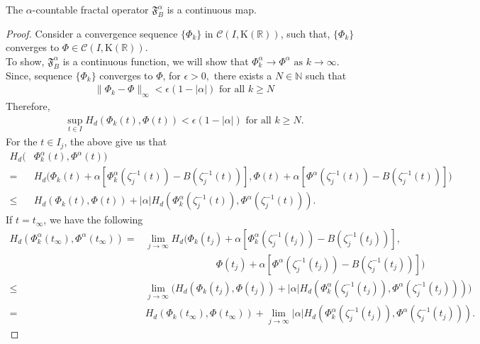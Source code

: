 \documentclass[10pt,a4paper]{amsart}
\begin{document}
\begin{theorem}\label{fractoperator}
The $\alpha$-countable fractal operator $\mathfrak{F}^{\alpha}_B$ is a continuous map.
\end{theorem}

\begin{proof}
Consider a convergence sequence $\{\Phi_k\}$ in $\mathcal{C}(I,\mathrm{K}(\mathbb{R}))$, such that, $\{\Phi_k\}$ converges to $\Phi\in \mathcal{C}(I,\mathrm{K}(\mathbb{R})).$  \\To show, $\mathfrak{F}^{\alpha}_B $ is a continuous function, we will show that $\Phi_k^{\alpha}\to \Phi^{\alpha} \text{ as }k\rightarrow\infty.$\\ Since, sequence $\{\Phi_k\}$ converges to $\Phi$, for $\epsilon>0,$ there exists a $N\in \mathbb{N}$ such that
\begin{align*}
    \lVert \Phi_k-\Phi\rVert_{\infty}< \epsilon(1-\lvert\alpha \rvert ) \text{  for all } k \geq N
\end{align*}
Therefore,
\begin{align*}
    \underset{t\in I}{\sup}H_d(\Phi_k(t), \Phi(t)) < \epsilon(1-\lvert\alpha\rvert ) \text{ for all } k \geq N.
    \end{align*}
  For the $t\in I_j$, the above give us that
    \begin{align*}
        H_d(&\Phi_k^{\alpha}(t), \Phi^{\alpha}(t))\\ =&H_{d}\bigg(\Phi_{k}(t)+\alpha\left[\Phi^{\alpha}_{k}(\zeta^{-1}_{j}(t))-B(\zeta^{-1}_{j}(t))\right], \Phi(t)+\alpha\left[\Phi^{\alpha}(\zeta^{-1}_{j}(t))-B(\zeta^{-1}_{j}(t))\right]\bigg)\\
\leq & H_{d}(\Phi_{k}(t),\Phi(t))+\lvert \alpha \rvert H_d(\Phi^{\alpha}_{k}(\zeta^{-1}_{j}(t)),\Phi^{\alpha}(\zeta^{-1}_{j}(t))).
   \end{align*}
   If $t=t_\infty $, we have the following
    \begin{align*}
         H_d(\Phi_k^{\alpha}(t_\infty), \Phi^{\alpha}(t_\infty)) =& \underset{j\rightarrow \infty}{\lim}H_{d}\bigg(\Phi_{k}(t_j)+\alpha\left[\Phi^{\alpha}_{k}(\zeta^{-1}_{j}(t_j))-B(\zeta^{-1}_{j}(t_j))\right], \\&\hspace{3cm}\Phi(t_j)+\alpha\left[\Phi^{\alpha}(\zeta^{-1}_{j}(t_j))-B(\zeta^{-1}_{j}(t_j))\right]\bigg)\\
\leq & \underset{j\rightarrow \infty}{\lim}\Big( H_{d}(\Phi_{k}(t_j),\Phi(t_j))+\lvert \alpha \rvert H_d(\Phi^{\alpha}_{k}(\zeta^{-1}_{j}(t_j)),\Phi^{\alpha}(\zeta^{-1}_{j}(t_j)))\Big)\\ =&  H_{d}(\Phi_{k}(t_\infty),\Phi(t_\infty))+\underset{j\rightarrow \infty}{\lim}\lvert \alpha \rvert H_d(\Phi^{\alpha}_{k}(\zeta^{-1}_{j}(t_j)),\Phi^{\alpha}(\zeta^{-1}_{j}(t_j))).

\end{align*}
\end{proof}
\end{document}
